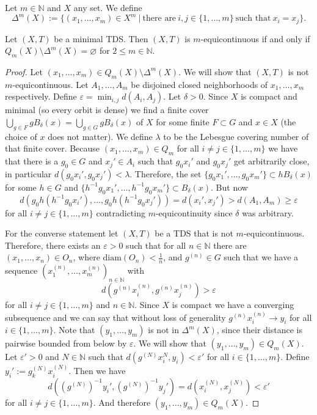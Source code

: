 \begin{definition}
Let $m \in \mathbb{N}$ and $X$ any set.
	We define
	\begin{equation*}
	\Delta^m(X) := \{ (x_1, \dots, x_m) \in X^m \ | \ \text{there are} \ i, j \in \{1, \dots, m\} \ \text{such that} \ x_i = x_j \}.
	\end{equation*}
\end{definition}

\begin{theorem}
	\label{thm:m-equiRelationChar}
	Let $(X, T)$ be a minimal TDS.
	Then $(X, T)$ is $m$-equicontinuous if and only if $Q_m(X) \setminus \Delta^m(X) = \varnothing$ for $2 \leq m \in \mathbb{N}$.
\end{theorem}
\begin{proof}
	Let $(x_1, \dots, x_m) \in Q_m(X) \setminus \Delta^m(X)$.
	We will show that $(X, T)$ is not $m$-equicontinuous.
	Let $A_1, \dots, A_m$ be disjoined closed neighborhoods of $x_1, \dots, x_m$ respectively.
	Define $\varepsilon = \min_{i, j} d(A_i, A_j)$.
	Let $\delta > 0$.
	Since $X$ is compact and minimal (so every orbit is dense) we find a finite cover $\bigcup_{g \in F} gB_\delta(x) = \bigcup_{g \in G} gB_\delta(x)$ of $X$ for some finite $F \subset G$ and $x \in X$ (the choice of $x$ does not matter).
	We define $\lambda$ to be the Lebesgue covering number of that finite cover.
	Because $(x_1, \dots, x_m) \in Q_m$ for all $i \neq j \in \{1, \dots, m\}$ we have that there is a $g_0 \in G$ and $x_j' \in A_i$ such that $g_0x_i'$ and $g_0 x_j'$ get arbitrarily close, in particular $d(g_0 x_i', g_0 x_j') < \lambda$.
	Therefore, the set $\{ g_0x_1', \dots, g_0x_m' \} \subset hB_\delta(x)$ for some $h \in G$ and $\{ h^{-1}g_0x_1', \dots, h^{-1}g_0x_m' \} \subset B_\delta(x)$.
	But now
	\[ d(g_0h(h^{-1}g_0x_i'), \dots, g_0h(h^{-1}g_0x_j')) = d(x_i', x_j') > d(A_1, A_m) \geq \varepsilon \]
	for all $i \neq j \in \{1, \dots, m\}$ contradicting $m$-equicontinuity since $\delta$ was arbitrary.

	For the converse statement let $(X, T)$ be a TDS that is not $m$-equicontinuous.
	Therefore, there exists an $\varepsilon > 0$ such that for all $n \in \mathbb{N}$ there are $(x_1, \dots, x_n) \in O_{n}$,
	where $\text{diam}(O_n) < \frac{1}{n}$, and $g^{(n)} \in G$ such that
	we have a sequence $(x_1^{(n)}, \dots, x_m^{(n)})_{n \in \mathbb{N}}$ with
	\[ d(g^{(n)}x_i^{(n)}, g^{(n)}x_j^{(n)}) > \varepsilon \]
 	for all $i \neq j \in \{1, \dots, m\}$ and $n \in \mathbb{N}$.
	Since $X$ is compact we have a converging subsequence and we can say that without loss of generality $g^{(n)}x_i^{(n)} \to y_i$ for all $i \in \{1, \dots, m\}$.
	Note that $(y_1, \dots, y_m)$ is not in $\Delta^m(X)$, since their distance is pairwise bounded from below by $\varepsilon$.
	We will show that $(y_1, \dots, y_m) \in Q_m(X)$.
	Let $\varepsilon' > 0$ and $N \in \mathbb{N}$ such that $d(g^{(N)}x_i^{N}, y_i) < \varepsilon'$ for all $i \in \{1, \dots, m\}$.
	Define $y_i' := g_k^{(N)} x_i^{(N)}$.
	Then we have
	\[ d((g^{(N)})^{-1} y_i', (g^{(N)})^{-1} y_j') = d(x_i^{(N)}, x_j^{(N)}) < \varepsilon' \]
	for all $i \neq j \in \{1, \dots, m\}$.
	And therefore $(y_1, \dots, y_m) \in Q_m(X)$.
 \end{proof}

